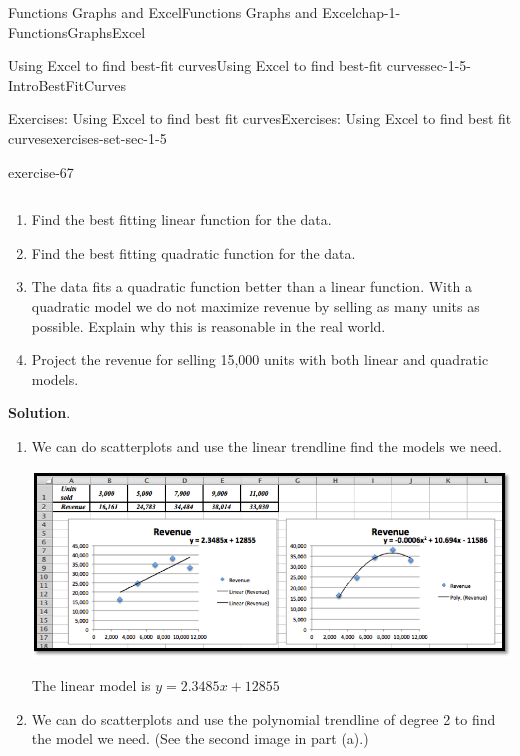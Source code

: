 \documentclass[oneside,10pt,]{book}
\numberwithin{equation}{section}
\begin{document}
\begin{chapterptx}{Functions Graphs and Excel}{}{Functions Graphs and Excel}{}{}{chap-1-FunctionsGraphsExcel}
\begin{sectionptx}{Using Excel to find best-fit curves}{}{Using Excel to find best-fit curves}{}{}{sec-1-5-IntroBestFitCurves}
\begin{exercises-subsection-numberless}{Exercises: Using Excel to find best fit curves}{}{Exercises: Using Excel to find best fit curves}{}{}{exercises-set-sec-1-5}
\begin{divisionexercise}{3}{}{}{exercise-67}
\begin{sidebyside}{1}{0}{0}{0}
\begin{sbspanel}{1}
{\begin{tabular}{cccccc}
\end{tabular}
\par}
\end{sbspanel}%
\end{sidebyside}%
\leavevmode%
\begin{enumerate}[label=(\alph*)]
\item\hypertarget{li-117}{}\hypertarget{p-419}{}%
Find the best fitting linear function for the data.%
\item\hypertarget{li-118}{}\hypertarget{p-420}{}%
Find the best fitting quadratic function for the data.%
\item\hypertarget{li-119}{}\hypertarget{p-421}{}%
The data fits a quadratic function better than a linear function.  With a quadratic model we do not maximize revenue by selling as many units as possible.  Explain why this is reasonable in the real world.%
\item\hypertarget{li-120}{}\hypertarget{p-422}{}%
Project the revenue for selling 15,000 units with both linear and quadratic models.%
\end{enumerate}
\par\smallskip%
\noindent\textbf{Solution}.\hypertarget{solution-33}{}\quad%
\leavevmode%
\begin{enumerate}[label=(\alph*)]
\item\hypertarget{li-121}{}\hypertarget{p-423}{}%
We can do scatterplots and use the linear trendline find the models we need. \leavevmode%
\begin{sidebyside}{1}{0}{0}{0}%
\begin{sbspanel}{1}%
\includegraphics[width=1\linewidth]{images/sec1-5-sol3a.png}
\end{sbspanel}%
\end{sidebyside}%
 The linear model is \(y = 2.3485x + 12855\)%
\item\hypertarget{li-122}{}\hypertarget{p-424}{}%
We can do scatterplots and use the polynomial trendline of degree 2 to find the model we need.  (See the second image in part (a).)%

\end{enumerate}
\end{divisionexercise}
\end{exercises-subsection-numberless}
\end{sectionptx}
\end{chapterptx}
\end{document}
